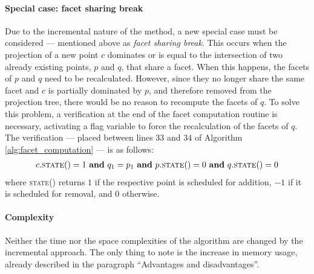 \paragraph{Special case: facet sharing break} Due to the incremental nature of the method, a new special case must be considered --- mentioned above as \textit{facet sharing break}. This occurs when the projection of a new point $c$ dominates or is equal to the intersection of two already existing points, $p$ and $q$, that share a facet. When this happens, the facets of $p$ and $q$ need to be recalculated. However, since they no longer share the same facet and $c$ is partially dominated by $p$, and therefore removed from the projection tree, there would be no reason to recompute the facets of $q$. To solve this problem, a verification at the end of the facet computation routine is necessary, activating a flag variable to force the recalculation of the facets of $q$. The verification --- placed between lines 33 and 34 of Algorithm \ref{alg:facet_computation} --- is as follows:
\begin{align*}
c.\textsc{state}() = 1\ \textbf{and}\ q_1 = p_1\ \textbf{and}\ p.\textsc{state}() = 0\ \textbf{and}\ q.\textsc{state}() = 0
\end{align*}
where \textsc{state}() returns $1$ if the respective point is scheduled for addition, $-1$ if it is scheduled for removal, and $0$ otherwise.

\paragraph{Complexity} Neither the time nor the space complexities of the algorithm are changed by the incremental approach. The only thing to note is the increase in memory usage, already described in the paragraph ``Advantages and disadvantages''.